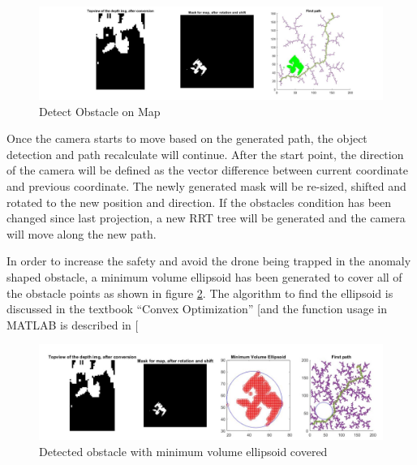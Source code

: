 \documentclass[
  oneside]{ubcthesis}
\begin{document}
\begin{figure}

{\centering \includegraphics[width=0.9\linewidth]{figures/8} 

}

\caption{Detect Obstacle on Map}\label{fig:figure8}
\end{figure}



Once the camera starts to move based on the generated path, the object detection and path recalculate will continue. After the start point, the direction of the camera will be defined as the vector difference between current coordinate and previous coordinate. The newly generated mask will be re-sized, shifted and rotated to the new position and direction. If the obstacles condition has been changed since last projection, a new RRT tree will be generated and the camera will move along the new path.

In order to increase the safety and avoid the drone being trapped in the anomaly shaped obstacle, a minimum volume ellipsoid has been generated to cover all of the obstacle points as shown in figure \ref{fig:figure9}. The algorithm to find the ellipsoid is discussed in the textbook ``Convex Optimization'' {[}\citep{convexOpt}and the function usage in MATLAB is described in {[}\citep{miniEllipsoid}

\begin{figure}

{\centering \includegraphics[width=0.9\linewidth]{figures/9} 

}

\caption{Detected obstacle with minimum volume ellipsoid covered}\label{fig:figure9}
\end{figure}
\end{document}
